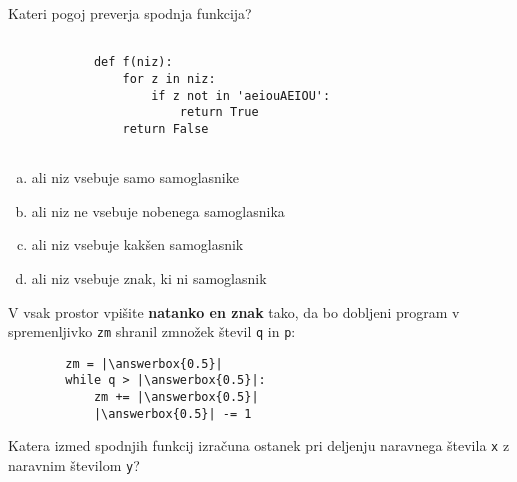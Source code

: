 \documentclass[arhiv, 10pt]{../izpit}
\newcommand{\inlinepy}[1]{\texttt{#1}}
\newcommand{\answerbox}[1]{\framebox{\vphantom{\large M}\hspace{#1cm}}}
\begin{document}
        \naloga*

        \begin{multicols}{2}
        \noindent
        Kateri pogoj preverja spodnja funkcija?
        \begin{verbatim}
        
            def f(niz):
                for z in niz:
                    if z not in 'aeiouAEIOU':
                        return True
                return False
            
        \end{verbatim}

        \begin{enumerate}[(a)]
\item ali niz vsebuje samo samoglasnike
\item ali niz ne vsebuje nobenega samoglasnika
\item ali niz vsebuje kakšen samoglasnik
\item ali niz vsebuje znak, ki ni samoglasnik
\end{enumerate}

        \end{multicols}
    
        \naloga*
        \begin{multicols}{2}
        \noindent
        V vsak prostor vpišite \textbf{natanko en znak} tako, da bo dobljeni program v spremenljivko \inlinepy{zm} shranil zmnožek števil \inlinepy{q} in \inlinepy{p}:
        
        \columnbreak
        \begin{verbatim}
        zm = |\answerbox{0.5}|
        while q > |\answerbox{0.5}|:
            zm += |\answerbox{0.5}|
            |\answerbox{0.5}| -= 1
        \end{verbatim}
        \end{multicols}
    
        \clearpage
        \naloga
        
        Katera izmed spodnjih funkcij izračuna ostanek pri deljenju naravnega števila \inlinepy{x} z naravnim številom \inlinepy{y}?
    
\end{document}
